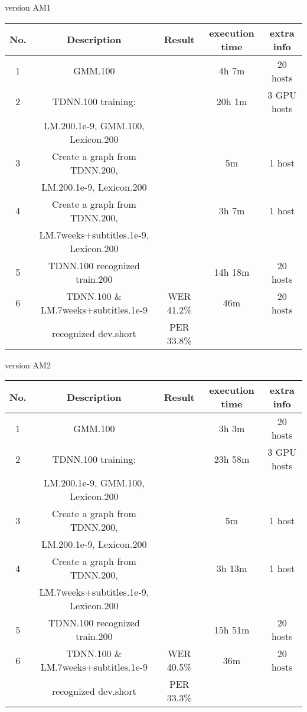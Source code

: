 version AM1
\begin{center}
\begin{tabular}{ | c | c | c | c |  c |  }
\hline
\textbf{No.} & \textbf{Description} & \textbf{Result} & \textbf{execution time} & \textbf{extra info} \\ \hline \hline
1 & GMM.100  &  & 4h 7m & 20 hosts \\  \hline

2 & TDNN.100 training: & & 20h 1m & 3 GPU hosts \\ 
 & LM.200.1e-9,  GMM.100, Lexicon.200 &  & & \\ \hline
 
3 & Create a graph from TDNN.200,  &  & 5m & 1 host \\  
 & LM.200.1e-9, Lexicon.200  & & & \\ \hline
 
4 & Create a graph from TDNN.200,  &   & 3h 7m & 1 host \\  
 & LM.7weeks+subtitles.1e-9, Lexicon.200  & & & \\ \hline

5 & TDNN.100 recognized train.200 &  & 14h 18m & 20 hosts \\  \hline 

6 & TDNN.100 \& LM.7weeks+subtitles.1e-9 & WER 41.2\%   & 46m & 20 hosts \\  
&  recognized dev.short & PER 33.8\% & & \\ \hline
\end{tabular}
\end{center}

version AM2
\begin{center}
\begin{tabular}{ | c | c | c | c |  c |  }
\hline
\textbf{No.} & \textbf{Description} & \textbf{Result} & \textbf{execution time} & \textbf{extra info} \\ \hline \hline
1 & GMM.100  &  & 3h 3m & 20 hosts \\  \hline

2 & TDNN.100 training: & & 23h 58m & 3 GPU hosts \\ 
 & LM.200.1e-9,  GMM.100, Lexicon.200 &  & & \\ \hline
 
3 & Create a graph from TDNN.200,  &  & 5m & 1 host \\  
 & LM.200.1e-9, Lexicon.200  & & & \\ \hline
 
4 & Create a graph from TDNN.200,  &   & 3h 13m & 1 host \\  
 & LM.7weeks+subtitles.1e-9, Lexicon.200  & & & \\ \hline

5 & TDNN.100 recognized train.200 &  & 15h 51m & 20 hosts \\  \hline 

6 & TDNN.100 \& LM.7weeks+subtitles.1e-9 & WER 40.5\%   & 36m & 20 hosts \\  
&  recognized dev.short & PER 33.3\% & & \\ \hline
\end{tabular}
\end{center}


